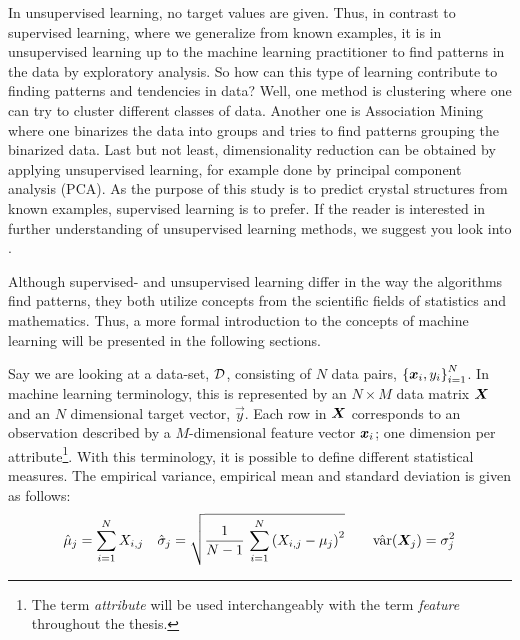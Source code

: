 In unsupervised learning, no target values are given. Thus, in contrast to supervised learning, where we generalize from known examples, it is in unsupervised learning up to the machine learning practitioner to find patterns in the data by exploratory analysis. So how can this type of learning contribute to finding patterns and tendencies in data? Well, one method is clustering where one can try to cluster different classes of data. Another one is Association Mining where one binarizes the data into groups and tries to find patterns grouping the binarized data. Last but not least, dimensionality reduction can be obtained by applying unsupervised learning, for example done by principal component analysis (PCA).
As the purpose of this study is to predict crystal structures from known examples, supervised learning is to prefer. If the reader is interested in further understanding of unsupervised learning methods, we suggest you look into \citep{allhailkingMorten,mueller_kussesne}. 

Although supervised- and unsupervised learning differ in the way the algorithms find patterns, they both utilize concepts from the scientific fields of statistics and mathematics. Thus, a more formal introduction to the concepts of machine learning will be presented in the following sections.



Say we are looking at a data-set, $\mathcal{D}$, consisting of $N$ data pairs, $\left\{ \bm{x}_i,y_i\right\}_{i=1}^{N}$. In machine learning terminology, this is represented by an $N \times M$ data matrix $\bm{X}$ and an $N$ dimensional target vector, $\vec{y}$.
Each row in $\bm{X}$ corresponds to an observation described by a $M$-dimensional feature vector $\bm{x}_i$; one dimension per attribute\footnote{The term \emph{attribute} will be used interchangeably with the term \emph{feature} throughout the thesis.}. With this terminology, it is possible to define different statistical  measures. The empirical variance, empirical mean and standard deviation is given as follows:
\begin{align*}
    &\hat{\mu}_j = \sum_{i=1}^N X_{i,j}   &&\hat{\sigma}_j = \sqrt{\dfrac{1}{N-1} \, \sum_{i=1}^N \qty(X_{i,j} - \mu_j )^2 }  &&&\mathrm{\hat{var}}\qty(\bm{X}_j) = \sigma_j^2
\end{align*}

\iffalse
Covariance\index{Covariance}/Correlation\index{Correlation} between attributes measures how the value of an attribute changes due to changes in another and is given by: 
\begin{align*}
    &\cov\qty[x,y] =\dfrac{1}{N-1}\sum_{i=1}^N \qty(x_i - \hat{\mu}) \cdot \qty(y_i - \hat{\mu}) &&\mathrm{c\hat{o}rr}\qty[x,y]= \dfrac{\cov\qty[x,y]}{\sigma_x \sigma_y}
\end{align*}
One can also construct a covariance matrix, $\boldsymbol{\Sigma}$ which is a $M \times M$ symmetric matrix where the $\Sigma_{i,j}$ denotes the $i$'th row and $j$'th column in $\covm$ equal to the covariance between variable $i$ and $j$.
\fi

